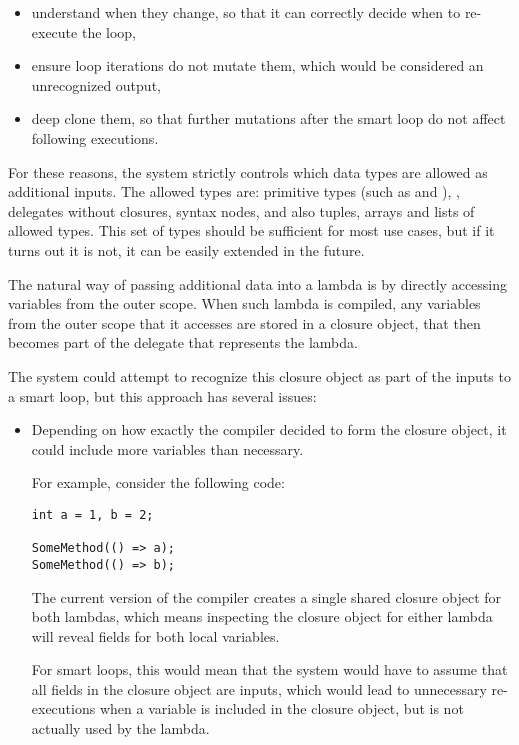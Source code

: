 \begin{itemize}
\begin{itemize}
\item understand when they change, so that it can correctly decide when to re-execute the loop,
\item ensure loop iterations do not mutate them, which would be considered an unrecognized output,
\item deep clone them, so that further mutations after the smart loop do not affect following executions.
\end{itemize}

For these reasons, the system strictly controls which data types are allowed as additional inputs. The allowed types are: primitive types (such as  and ), , delegates without closures, syntax nodes, and also tuples, arrays and lists of allowed types. This set of types should be sufficient for most use cases, but if it turns out it is not, it can be easily extended in the future.

\medskip

The natural way of passing additional data into a lambda is by directly accessing variables from the outer scope. When such lambda is compiled, any variables from the outer scope that it accesses are stored in a closure object, that then becomes part of the delegate that represents the lambda.

The system could attempt to recognize this closure object as part of the inputs to a smart loop, but this approach has several issues:

\begin{itemize}
\item Depending on how exactly the compiler decided to form the closure object, it could include more variables than necessary.

For example, consider the following code:

\begin{verbatim}
int a = 1, b = 2;

SomeMethod(() => a);
SomeMethod(() => b);
\end{verbatim}

The current version of the compiler creates a single shared closure object for both lambdas, which means inspecting the closure object for either lambda will reveal fields for both local variables.

For smart loops, this would mean that the system would have to assume that all fields in the closure object are inputs, which would lead to unnecessary re-executions when a variable is included in the closure object, but is not actually used by the lambda.


\end{itemize}
\end{itemize}
